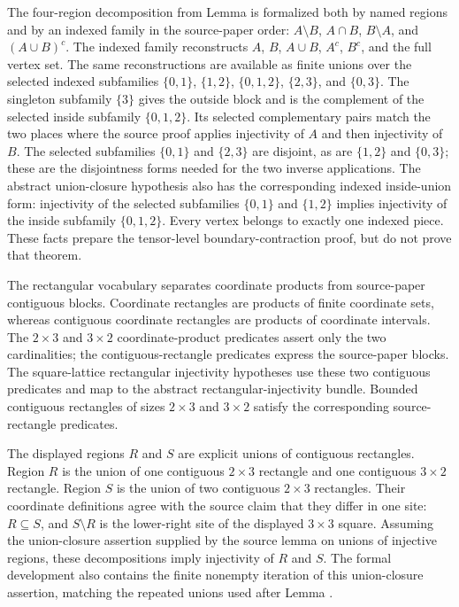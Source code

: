 \documentclass{article}
\begin{document}
The four-region decomposition from Lemma  is formalized
both by named regions and by an indexed family in the source-paper order:
$A\setminus B$, $A\cap B$, $B\setminus A$, and $(A\cup B)^c$. The indexed
family reconstructs $A$, $B$, $A\cup B$, $A^c$, $B^c$, and the full vertex set.
The same reconstructions are available as finite unions over the selected
indexed subfamilies $\{0,1\}$, $\{1,2\}$, $\{0,1,2\}$, $\{2,3\}$, and
$\{0,3\}$. The singleton subfamily $\{3\}$ gives the outside block and is the
complement of the selected inside subfamily $\{0,1,2\}$. Its selected
complementary pairs match the two places where the source proof applies
injectivity of $A$ and then injectivity of $B$. The
selected subfamilies $\{0,1\}$ and $\{2,3\}$ are disjoint, as are
$\{1,2\}$ and $\{0,3\}$; these are the disjointness forms needed for the two
inverse applications. The abstract union-closure hypothesis also has the
corresponding indexed inside-union form: injectivity of the selected subfamilies
$\{0,1\}$ and $\{1,2\}$ implies injectivity of the inside subfamily
$\{0,1,2\}$. Every vertex belongs to exactly one indexed piece. These facts
prepare the tensor-level boundary-contraction proof, but do not prove that
theorem.

The rectangular vocabulary separates coordinate products from source-paper
contiguous blocks. Coordinate rectangles are products of finite coordinate
sets, whereas contiguous coordinate rectangles are products of coordinate
intervals. The $2\times3$ and $3\times2$ coordinate-product predicates assert
only the two cardinalities; the contiguous-rectangle predicates express the
source-paper blocks. The square-lattice rectangular injectivity hypotheses use
these two contiguous predicates and map to the abstract rectangular-injectivity
bundle. Bounded contiguous rectangles of sizes $2\times3$ and $3\times2$
satisfy the corresponding source-rectangle predicates.

The displayed regions $R$ and $S$ are explicit unions of contiguous
rectangles. Region $R$ is the union of one contiguous $2\times3$ rectangle and
one contiguous $3\times2$ rectangle. Region $S$ is the union of two contiguous
$2\times3$ rectangles. Their coordinate definitions agree with the source
claim that they differ in one site: $R\subseteq S$, and $S\setminus R$ is the
lower-right site of the displayed $3\times3$ square. Assuming the
union-closure assertion supplied by the source lemma on unions of injective
regions, these decompositions imply injectivity of $R$ and $S$. The formal
development also contains the finite nonempty iteration of this union-closure
assertion, matching the repeated unions used after Lemma
.
\end{document}
